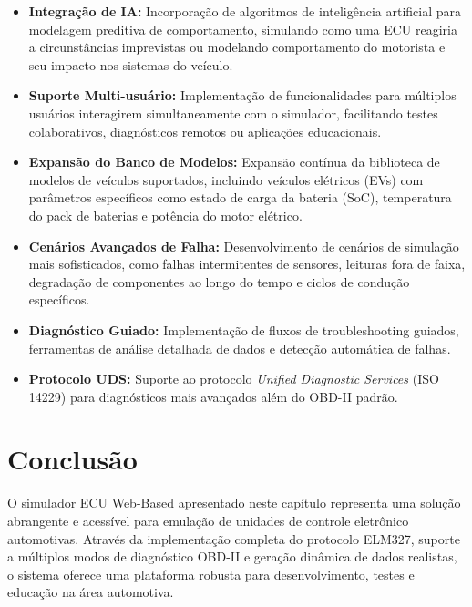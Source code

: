 \begin{itemize}
    \item \textbf{Integração de IA:} Incorporação de algoritmos de inteligência artificial para modelagem preditiva de comportamento, simulando como uma ECU reagiria a circunstâncias imprevistas ou modelando comportamento do motorista e seu impacto nos sistemas do veículo.
    
    \item \textbf{Suporte Multi-usuário:} Implementação de funcionalidades para múltiplos usuários interagirem simultaneamente com o simulador, facilitando testes colaborativos, diagnósticos remotos ou aplicações educacionais.
    
    \item \textbf{Expansão do Banco de Modelos:} Expansão contínua da biblioteca de modelos de veículos suportados, incluindo veículos elétricos (EVs) com parâmetros específicos como estado de carga da bateria (SoC), temperatura do pack de baterias e potência do motor elétrico.
    
    \item \textbf{Cenários Avançados de Falha:} Desenvolvimento de cenários de simulação mais sofisticados, como falhas intermitentes de sensores, leituras fora de faixa, degradação de componentes ao longo do tempo e ciclos de condução específicos.
    
    \item \textbf{Diagnóstico Guiado:} Implementação de fluxos de troubleshooting guiados, ferramentas de análise detalhada de dados e detecção automática de falhas.
    
    \item \textbf{Protocolo UDS:} Suporte ao protocolo \textit{Unified Diagnostic Services} (ISO 14229) para diagnósticos mais avançados além do OBD-II padrão.
\end{itemize}

\section{Conclusão}
\label{sec:conclusao}

O simulador ECU Web-Based apresentado neste capítulo representa uma solução abrangente e acessível para emulação de unidades de controle eletrônico automotivas. Através da implementação completa do protocolo ELM327, suporte a múltiplos modos de diagnóstico OBD-II e geração dinâmica de dados realistas, o sistema oferece uma plataforma robusta para desenvolvimento, testes e educação na área automotiva.

